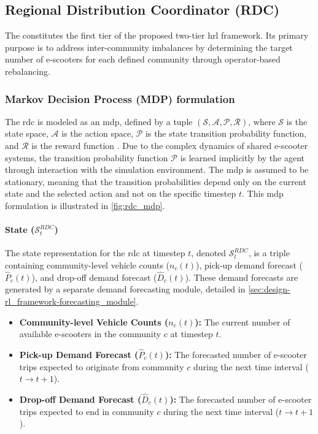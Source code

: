 \subsection{Regional Distribution Coordinator (RDC)}\label{sec:design-rl_framework-rdc}
The  constitutes the first tier of the proposed two-tier \gls{hrl} framework.
Its primary purpose is to address inter-community imbalances by determining the target number of e-scooters for each defined community through operator-based rebalancing.

\subsubsection{Markov Decision Process (MDP) formulation}
The \gls{rdc} is modeled as an \gls{mdp}, defined by a tuple $(\mathcal{S, A, P, R})$, where $\mathcal{S}$ is the state space, $\mathcal{A}$ is the action space, $\mathcal{P}$ is the state transition probability function, and $\mathcal{R}$ is the reward function \cite{sutton_reinforcement_2018}.
Due to the complex dynamics of shared e-scooter systems, the transition probability function $\mathcal{P}$ is learned implicitly by the agent through interaction with the simulation environment.
The \gls{mdp} is assumed to be stationary, meaning that the transition probabilities depend only on the current state and the selected action and not on the specific timestep $t$.
This \gls{mdp} formulation is illustrated in \autoref{fig:rdc_mdp}.

\paragraph{State ($\mathcal{S}^{RDC}_t$)}
The state representation for the \gls{rdc} at timestep $t$, denoted $\mathcal{S}^{RDC}_t$, is a triple containing community-level vehicle counts ($n_c(t)$), pick-up demand forecast ($\hat{P}_c(t)$), and drop-off demand forecast ($\hat{D}_c(t)$).
These demand forecasts are generated by a separate demand forecasting module, detailed in \autoref{sec:design-rl_framework-forecasting_module}.


\begin{itemize}
    \item \textbf{Community-level Vehicle Counts ($n_c(t)$):}
    The current number of available e-scooters in the community $c$ at timestep $t$.
    \item \textbf{Pick-up Demand Forecast ($\hat{P}_c(t)$):}
    The forecasted number of e-scooter trips expected to originate from community $c$ during the next time interval ($t \to t+1$).
    \item \textbf{Drop-off Demand Forecast ($\hat{D}_c(t)$):}
    The forecasted number of e-scooter trips expected to end in community $c$ during the next time interval ($t \to t+1$).
\end{itemize}

